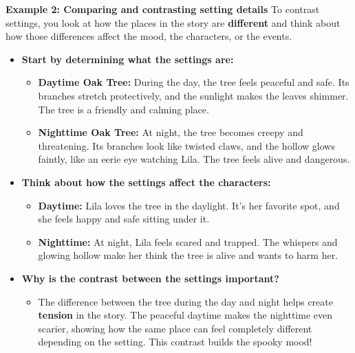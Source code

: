 \documentclass[12pt]{article}
\begin{document}
\begin{tcolorbox}[colframe=black!60, colback=white, 
coltitle=black, colbacktitle=black!15, fonttitle=\bfseries\Large, 
title=Examples, halign title=center, left=10pt, right=10pt, top=10pt, bottom=15pt]

\textbf{Example 2: Comparing and contrasting setting details}
To contrast settings, you look at how the places in the story are \textbf{different} and think about how those differences affect the mood, the characters, or the events. 
\begin{itemize}
    \item \textbf{Start by determining what the settings are:}
  \begin{itemize}
      \item \textbf{  Daytime Oak Tree:} During the day, the tree feels peaceful and safe. Its branches stretch protectively, and the sunlight makes the leaves shimmer. The tree is a friendly and calming place.
  \end{itemize}

 \begin{itemize}
     \item \textbf{ Nighttime Oak Tree:} At night, the tree becomes creepy and threatening. Its branches look like twisted claws, and the hollow glows faintly, like an eerie eye watching Lila. The tree feels alive and dangerous.
 \end{itemize}

  
   \item \textbf{Think about how the settings affect the characters:}
    \begin{itemize}
        \item \textbf{Daytime:} Lila loves the tree in the daylight. It’s her favorite spot, and she feels happy and safe sitting under it.
    \end{itemize}
    \begin{itemize}
        \item \textbf{Nighttime:} At night, Lila feels scared and trapped. The whispers and glowing hollow make her think the tree is alive and wants to harm her.
    \end{itemize}

   \item \textbf{Why is the contrast between the settings important?}
   \begin{itemize}
       \item The difference between the tree during the day and night helps create \textbf{tension} in the story. The peaceful daytime makes the nighttime even scarier, showing how the same place can feel completely different depending on the setting. This contrast builds the spooky mood!
   \end{itemize}


   \end{itemize}



 





 





     \end{tcolorbox}
\end{document}
